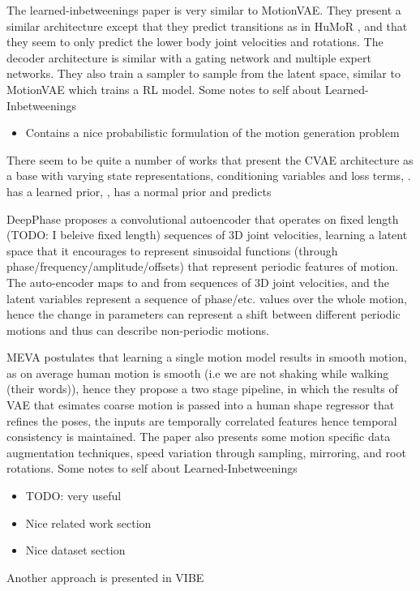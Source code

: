 The learned-inbetweenings \cite{learnedInbetweening} paper is very similar to MotionVAE. They present a similar architecture except that they predict transitions as in HuMoR \cite{humor}, and that they seem to only predict the lower body joint velocities and rotations. The decoder architecture is similar with a gating network and multiple expert networks. They also train a sampler to sample from the latent space, similar to MotionVAE which trains a RL model.
Some notes to self about Learned-Inbetweenings
\begin{itemize}
    \item Contains a nice probabilistic formulation of the motion generation problem
\end{itemize}


There seem to be quite a number of works that present the CVAE architecture as a base with varying state representations, conditioning variables and loss terms, \cite{humor, learnedInbetweening, MotionVAE,structured4Dlatentspace}. \cite{humor} has a learned prior, , \cite{learnedInbetweening} has a normal prior and predicts


DeepPhase \cite{DeepPhase} proposes a convolutional autoencoder that operates on fixed length (TODO: I beleive fixed length) sequences of 3D joint velocities, learning a latent space that it encourages to represent sinusoidal functions (through phase/frequency/amplitude/offsets) that represent periodic features of motion. The auto-encoder maps to and from sequences of 3D joint velocities, and the latent variables represent a sequence of phase/etc. values over the whole motion, hence the change in parameters can represent a shift between different periodic motions and thus can describe non-periodic motions.


MEVA \cite{MEVA} postulates that learning a single motion model results in smooth motion, as on average human motion is smooth (i.e we are not shaking while walking (their words)), hence they propose a two stage pipeline, in which the results of VAE that esimates coarse motion is passed into a human shape regressor that refines the poses, the inputs are temporally correlated features hence temporal consistency is maintained. The paper also presents some motion specific data augmentation techniques, speed variation through sampling, mirroring, and root rotations. 
Some notes to self about Learned-Inbetweenings
\begin{itemize}
    \item TODO: very useful
    \item Nice related work section
    \item Nice dataset section
\end{itemize}


Another approach is presented in VIBE 